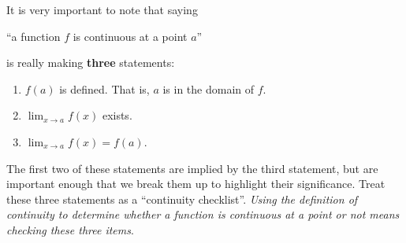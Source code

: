 \documentclass{ximera}
\begin{document}
It is very important to note that saying
\begin{center}
  ``a function $f$ is continuous at a point $a$''
\end{center}
is really making \textbf{three} statements:
\begin{enumerate}
	\item $f(a)$ is defined.  That is, $a$ is in the domain of $f$.
	\item $\lim_{x\to a} f(x)$ exists.
	\item $\lim_{x\to a} f(x) = f(a)$.
\end{enumerate}

The first two of these statements are implied by the third statement, but are important enough that we break them up
to highlight their significance. Treat these three statements as a ``continuity checklist''. \emph{Using the definition of continuity to determine whether a function is continuous at a point or not means checking these three items}.
\end{document}
